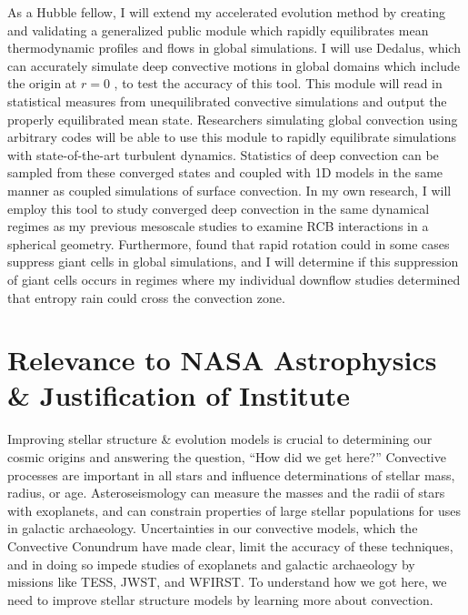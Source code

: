 \documentclass[preprint, hmargin=1in, vmargin=1in]{aastex62}
\begin{document}
As a Hubble fellow, I will extend my accelerated evolution method by creating and validating a generalized public module which rapidly equilibrates mean thermodynamic profiles and flows in global simulations.
I will use Dedalus, which can accurately simulate deep convective motions in global domains which include the origin at $r = 0$ \citep[as visualized in Fig.~\ref{fig:mdwarf}, and tested in][]{lecoanet&all2019}, to test the accuracy of this tool.
This module will read in statistical measures from unequilibrated convective simulations and output the properly equilibrated mean state.
Researchers simulating global convection using arbitrary codes will be able to use this module to rapidly equilibrate simulations with state-of-the-art turbulent dynamics.
Statistics of deep convection can be sampled from these converged states and coupled with 1D models in the same manner as \citet{jorgensen&weiss2019} coupled simulations of surface convection.
In my own research, I will employ this tool to study converged deep convection in the same dynamical regimes as my previous mesoscale studies to examine RCB interactions in a spherical geometry.
Furthermore, \citet{featherstone&hindman2016} found that rapid rotation could in some cases suppress giant cells in global simulations, and I will determine if this suppression of giant cells occurs in regimes where my individual downflow studies determined that entropy rain could cross the convection zone.


\section*{\textbf{Relevance to NASA Astrophysics \& Justification of Institute}}
Improving stellar structure \& evolution models is crucial to determining our cosmic origins and answering the question, ``How did we get here?''
Convective processes are important in all stars and influence determinations of stellar mass, radius, or age.
Asteroseismology can measure the masses and the radii of stars with exoplanets, and can constrain properties of large stellar populations for uses in galactic archaeology.
Uncertainties in our convective models, which the Convective Conundrum have made clear, limit the accuracy of these techniques, and in doing so impede studies of exoplanets and galactic archaeology by missions like TESS, JWST, and WFIRST.
To understand how we got here, we need to improve stellar structure models by learning more about convection.
\end{document}
